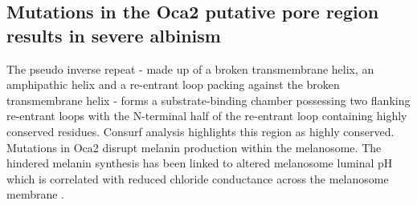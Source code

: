 \subsection{Mutations in the Oca2 putative pore region results in severe albinism}

The pseudo inverse repeat - made up of a broken transmembrane helix, an amphipathic helix and a re-entrant loop packing against the broken transmembrane helix - forms a substrate-binding chamber possessing two flanking re-entrant loops with the N-terminal half of the re-entrant loop containing highly conserved residues.  Consurf \cite{Ashkenazy2016} analysis highlights this region as highly conserved.  Mutations in Oca2 disrupt melanin production within the melanosome. The hindered melanin synthesis has been linked to altered melanosome luminal pH which is correlated with reduced chloride conductance across the melanosome membrane \cite{bellono2014intracellular}. 

